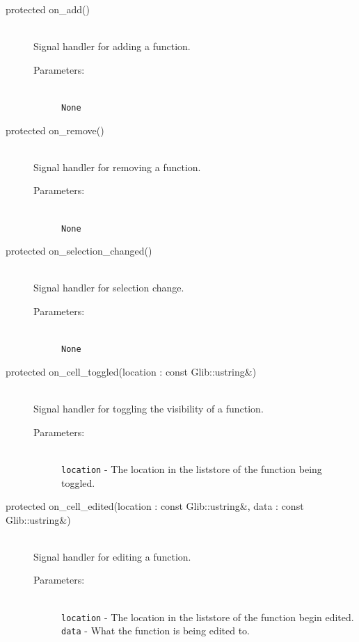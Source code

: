 \documentclass[a4paper,11pt]{kth-mag}
\begin{document}
\begin{description}
    \item[protected on\_add()]~\\
    Signal handler for adding a function.
    \begin{description}
        \item[Parameters:]~\\
            \verb+None+
    \end{description}
\end{description}
\begin{description}
    \item[protected on\_remove()]~\\
    Signal handler for removing a function.
    \begin{description}
        \item[Parameters:]~\\
            \verb+None+
    \end{description}
\end{description}
\begin{description}
    \item[protected on\_selection\_changed()]~\\
    Signal handler for selection change.
    \begin{description}
        \item[Parameters:]~\\
            \verb+None+
    \end{description}
\end{description}
\begin{description}
    \item[protected on\_cell\_toggled(location : const Glib::ustring\&)]~\\
    Signal handler for toggling the visibility of a function.
    \begin{description}
        \item[Parameters:]~\\
            \verb+location+ - The location in the liststore of the function
            being toggled.
    \end{description}
\end{description}
\begin{description}
    \item[protected on\_cell\_edited(location : const Glib::ustring\&, 
        data : const Glib::ustring\&)]~\\
    Signal handler for editing a function.
    \begin{description}
        \item[Parameters:]~\\
            \verb+location+ - The location in the liststore of the function
            begin edited. \\
            \verb+data+ - What the function is being edited to.
    \end{description}
\end{description}
\end{document}

